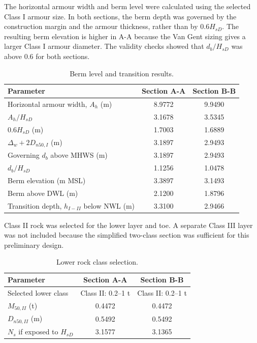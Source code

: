 \documentclass[a4paper, 11pt]{article}
\begin{document}
The horizontal armour width and berm level were calculated using the selected Class I armour size. In both sections, the berm depth was governed by the construction margin and the armour thickness, rather than by \(0.6H_{sD}\). The resulting berm elevation is higher in A-A because the Van Gent sizing gives a larger Class I armour diameter. The validity checks showed that \(d_b/H_{sD}\) was above 0.6 for both sections.

\begin{table}[H]
\centering
\caption{Berm level and transition results.}
\label{tab:berm_level_transition}
\begin{tabular}{l c c}
\hline
Parameter & Section A-A & Section B-B \\
\hline
Horizontal armour width, \(A_h\) (m) & 8.9772 & 9.9490 \\
\(A_h/H_{sD}\) & 3.1678 & 3.5345 \\
\(0.6H_{sD}\) (m) & 1.7003 & 1.6889 \\
\(\Delta_w+2D_{n50,I}\) (m) & 3.1897 & 2.9493 \\
Governing \(d_b\) above MHWS (m) & 3.1897 & 2.9493 \\
\(d_b/H_{sD}\) & 1.1256 & 1.0478 \\
Berm elevation (m MSL) & 3.3897 & 3.1493 \\
Berm above DWL (m) & 2.1200 & 1.8796 \\
Transition depth, \(h_{I-II}\) below NWL (m) & 3.3100 & 2.9466 \\
\hline
\end{tabular}
\end{table}

Class II rock was selected for the lower layer and toe. A separate Class III layer was not included because the simplified two-class section was sufficient for this preliminary design.

\begin{table}[H]
\centering
\caption{Lower rock class selection.}
\label{tab:berm_lower_class}
\begin{tabular}{l c c}
\hline
Parameter & Section A-A & Section B-B \\
\hline
Selected lower class & Class II: 0.2--1 t & Class II: 0.2--1 t \\
\(M_{50,II}\) (t) & 0.4472 & 0.4472 \\
\(D_{n50,II}\) (m) & 0.5492 & 0.5492 \\
\(N_s\) if exposed to \(H_{sD}\) & 3.1577 & 3.1365 \\
\hline
\end{tabular}
\end{table}
\end{document}
